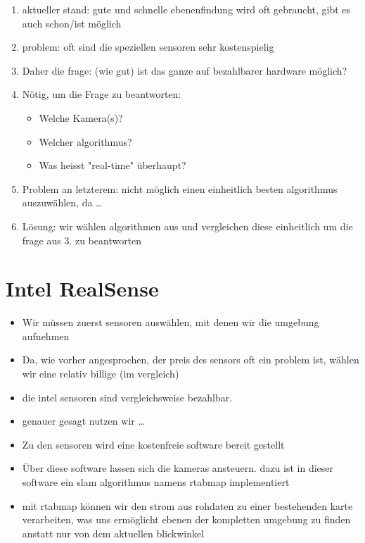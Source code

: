 \documentclass[main.tex]{subfiles}
\begin{document}
\begin{enumerate}
    \item aktueller stand: gute und schnelle ebenenfindung wird oft gebraucht, gibt es auch schon/ist möglich
    \item problem: oft sind die speziellen sensoren sehr kostenspielig
    \item Daher die frage: (wie gut) ist das ganze auf bezahlbarer hardware möglich?
    \item Nötig, um die Frage zu beantworten: 
        \begin{itemize}
            \item Welche Kamera(s)? %
            \item Welcher algorithmus?
            \item Was heisst "real-time" überhaupt?
        \end{itemize} 
        \item Problem an letzterem: nicht möglich einen einheitlich besten algorithmus auszuwählen, da \dots{}  %
    \item Lösung: wir wählen algorithmen aus und vergleichen diese einheitlich um die frage aus 3. zu beantworten
\end{enumerate}

\section{Intel RealSense}
\begin{itemize}
    \item Wir müssen zuerst sensoren auswählen, mit denen wir die umgebung aufnehmen
    \item Da, wie vorher angesprochen, der preis des sensors oft ein problem ist, wählen wir eine relativ billige (im vergleich)
    \item die intel sensoren sind vergleichsweise bezahlbar. 
    \item genauer gesagt nutzen wir \dots{}
    \item Zu den sensoren wird eine kostenfreie software bereit gestellt
    \item Über diese software lassen sich die kameras ansteuern. dazu ist in dieser software ein slam algorithmus namens rtabmap implementiert
    \item mit rtabmap können wir den strom aus rohdaten zu einer bestehenden karte verarbeiten, was uns ermöglicht ebenen der kompletten umgebung zu finden anstatt nur von dem aktuellen blickwinkel
\end{itemize}
\end{document}
